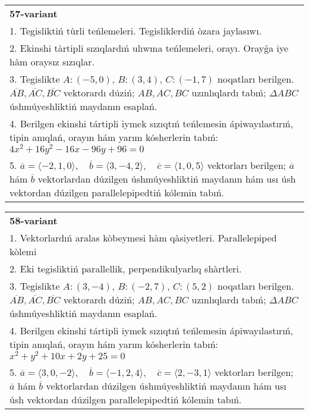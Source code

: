 \documentclass{article}
\begin{document}
\begin{tabular}{m{17cm}}
\textbf{57-variant}\\
1. Tegisliktiń tùrli teńlemeleri. Tegisliklerdiń òzara jaylasıwı.\\

2. Ekinshi tàrtipli sızıqlardıń ulıwma teńlemeleri, orayı. Orayǵa iye hàm oraysız sızıqlar.\\

3. Tegislikte $A: (-5, 0)$, $B: (3, 4)$, $C: (-1, 7)$ noqatları berilgen. $\overline{AB}, \overline{AC}, \overline{BC}$ vektorardı dúziń; $AB, AC, BC$ uzınlıqlardı tabıń; $\Delta ABC$ úshmúyeshliktiń maydanın esaplań. \\

4. Berilgen ekinshi tártipli iymek sızıqtıń teńlemesin ápiwayılastırıń, tipin anıqlań, orayın hám yarım kósherlerin tabıń: $4x^2+16y^2-16x-96y+96=0$\\

5. \(\overline{a} = \langle -2, 1, 0 \rangle, \quad \overline{b} = \langle 3, -4, 2 \rangle, \quad \overline{c} = \langle 1, 0, 5 \rangle\) vektorları berilgen; \(\overline{a}\) hám \(\overline{b}\) vektorlardan dúzilgen úshmúyeshliktiń maydanın hám usı úsh vektordan dúzilgen parallelepipedtiń kólemin tabıń.
\end{tabular}
\vspace{1cm}


\begin{tabular}{m{17cm}}
\textbf{58-variant}\\
1. Vektorlardıń aralas kòbeymesi hàm qàsiyetleri. Parallelepiped kòlemi\\

2. Eki tegisliktiń parallellik, perpendikulyarlıq shàrtleri.\\

3. Tegislikte $A: (3, -4)$, $B: (-2, 7)$, $C: (5, 2)$ noqatları berilgen. $\overline{AB}, \overline{AC}, \overline{BC}$ vektorardı dúziń; $AB, AC, BC$ uzınlıqlardı tabıń; $\Delta ABC$ úshmúyeshliktiń maydanın esaplań. \\

4. Berilgen ekinshi tártipli iymek sızıqtıń teńlemesin ápiwayılastırıń, tipin anıqlań, orayın hám yarım kósherlerin tabıń: $x^2+y^2+10x+2y+25=0$\\

5. \(\overline{a} = \langle 3, 0, -2 \rangle, \quad \overline{b} = \langle -1, 2, 4 \rangle, \quad \overline{c} = \langle 2, -3, 1 \rangle\) vektorları berilgen; \(\overline{a}\) hám \(\overline{b}\) vektorlardan dúzilgen úshmúyeshliktiń maydanın hám usı úsh vektordan dúzilgen parallelepipedtiń kólemin tabıń.
\end{tabular}
\vspace{1cm}
\end{document}

